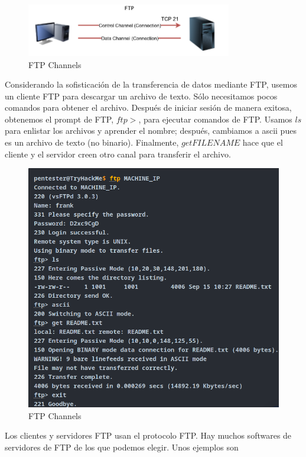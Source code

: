 \documentclass[12pt]{report}
\begin{document}
\begin{figure}[h]
\centering
\includegraphics[width=0.8\textwidth]{Ftp-Channels.jpg}
\caption{FTP Channels}
\end{figure}

Considerando la sofisticación de la transferencia de datos mediante FTP, usemos un 
cliente FTP para descargar un archivo de texto. Sólo necesitamos pocos comandos para 
obtener el archivo. Después de iniciar sesión de manera exitosa, obtenemos el prompt
de FTP, $ftp>$, para ejecutar comandos de FTP. Usamos $ls$ para enlistar
los archivos y aprender el nombre; después, cambiamos a ascii pues es un archivo de texto 
(no binario). Finalmente, $get FILENAME$ hace que el cliente y el servidor creen otro 
canal para transferir el archivo.

\begin{figure}[h]
\centering
\includegraphics[width=1\textwidth]{Ftp-Transfer.jpg}
\caption{FTP Channels}
\end{figure}

Los clientes y servidores FTP usan el protocolo FTP. Hay muchos softwares de servidores
de FTP de los que podemos elegir. Unos ejemplos son
\end{document}
